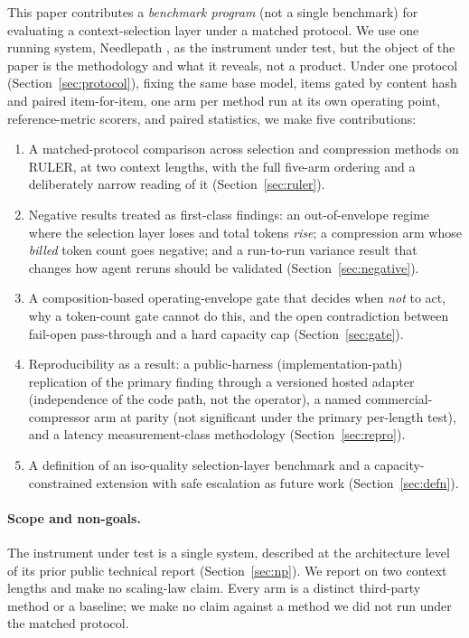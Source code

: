 \documentclass[11pt]{article}
\newcommand{\NP}{Needlepath}
\begin{document}
This paper contributes a \emph{benchmark program} (not a single benchmark) for evaluating
a context-selection layer under a matched protocol. We use one running system, \NP{}
\citep{rao2026needlepath}, as the
instrument under test, but the object of the paper is the methodology and what it reveals, not a
product. Under one protocol (Section~\ref{sec:protocol}), fixing the same base model, items gated by
content hash and paired item-for-item, one arm per method run at its own operating point,
reference-metric scorers, and paired statistics, we make five contributions:

\begin{enumerate}
  \item A matched-protocol comparison across selection and compression methods on RULER, at two
  context lengths, with the full five-arm ordering and a deliberately narrow reading of it
  (Section~\ref{sec:ruler}).
  \item Negative results treated as first-class findings: an out-of-envelope regime where the
  selection layer loses and total tokens \emph{rise}; a compression arm whose \emph{billed}
  token count goes negative; and a run-to-run variance result that changes how agent reruns
  should be validated (Section~\ref{sec:negative}).
  \item A composition-based operating-envelope gate that decides when \emph{not} to act, why a
  token-count gate cannot do this, and the open contradiction between fail-open pass-through and
  a hard capacity cap (Section~\ref{sec:gate}).
  \item Reproducibility as a result: a public-harness (implementation-path) replication of the
  primary finding through a versioned hosted adapter (independence of the code path, not the
  operator), a named commercial-compressor arm at parity (not significant under the primary
  per-length test), and a latency measurement-class methodology (Section~\ref{sec:repro}).
  \item A definition of an iso-quality selection-layer benchmark and a capacity-constrained
  extension with safe escalation as future work (Section~\ref{sec:defn}).
\end{enumerate}

\paragraph{Scope and non-goals.} The instrument under test is a single system, described at the
architecture level of its prior public technical report (Section~\ref{sec:np}). We report on two
context lengths and make no scaling-law claim. Every arm is a distinct third-party method or a
baseline; we make no claim against a method we did not run under the matched protocol.
\end{document}
